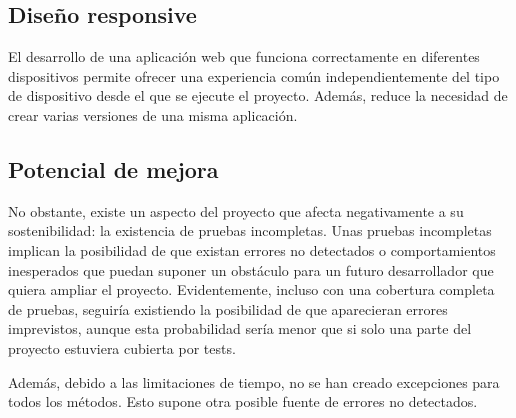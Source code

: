 \subsection{Diseño responsive}
El desarrollo de una aplicación web que funciona correctamente en diferentes dispositivos permite ofrecer una experiencia común independientemente del tipo de dispositivo desde el que se ejecute el proyecto. Además, reduce la necesidad de crear varias versiones de una misma aplicación.

\subsection{Potencial de mejora}
No obstante, existe un aspecto del proyecto que afecta negativamente a su sostenibilidad: la existencia de pruebas incompletas. Unas pruebas incompletas implican la posibilidad de que existan errores no detectados o comportamientos inesperados que puedan suponer un obstáculo para un futuro desarrollador que quiera ampliar el proyecto. Evidentemente, incluso con una cobertura completa de pruebas, seguiría existiendo la posibilidad de que aparecieran errores imprevistos, aunque esta probabilidad sería menor que si solo una parte del proyecto estuviera cubierta por tests.

Además, debido a las limitaciones de tiempo, no se han creado excepciones para todos los métodos. Esto supone otra posible fuente de errores no detectados.
